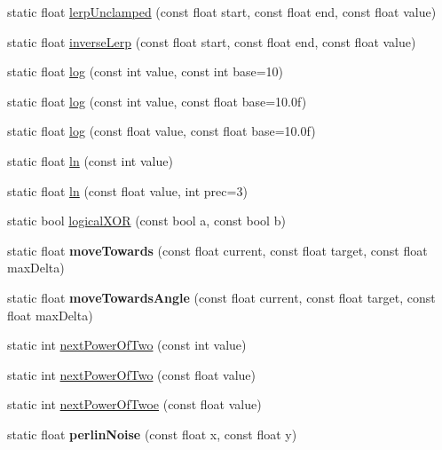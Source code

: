 \begin{DoxyCompactItemize}
\item 
static float \hyperlink{class_matth_a6336a42efd5500e7c470a04eefbcb778}{lerp\+Unclamped} (const float start, const float end, const float value)
\item 
static float \hyperlink{class_matth_a0f4cf803a6e526cd3917810a5f151886}{inverse\+Lerp} (const float start, const float end, const float value)
\item 
static float \hyperlink{class_matth_afba8bc869a1847fa5ea6f2d7ddd66df8}{log} (const int value, const int base=10)
\item 
static float \hyperlink{class_matth_aeee95b77e08d2b8eeb765cba3d3428ef}{log} (const int value, const float base=10.\+0f)
\item 
static float \hyperlink{class_matth_a3b3c174cf818dafa2bb0868c0be2d91a}{log} (const float value, const float base=10.\+0f)
\item 
static float \hyperlink{class_matth_a63ba77faee2dc493e1c23592139426af}{ln} (const int value)
\item 
static float \hyperlink{class_matth_a2e6c35db4051df0578fab51d4ae794b9}{ln} (const float value, int prec=3)
\item 
static bool \hyperlink{class_matth_ac159082536b46168144c41a4d60e2b83}{logical\+X\+O\+R} (const bool a, const bool b)
\item 
\hypertarget{class_matth_a4f366db2949ecfe682dab88bdcf3a824}{}static float {\bfseries move\+Towards} (const float current, const float target, const float max\+Delta)\label{class_matth_a4f366db2949ecfe682dab88bdcf3a824}

\item 
\hypertarget{class_matth_a4e035c33e43aa8bef4c9b548397732e6}{}static float {\bfseries move\+Towards\+Angle} (const float current, const float target, const float max\+Delta)\label{class_matth_a4e035c33e43aa8bef4c9b548397732e6}

\item 
static int \hyperlink{class_matth_a14ad60da4d1beb165d75ee063507d5f5}{next\+Power\+Of\+Two} (const int value)
\item 
static int \hyperlink{class_matth_ab5995f6ad58e9f09fdc30e7978276e68}{next\+Power\+Of\+Two} (const float value)
\item 
static int \hyperlink{class_matth_a930836f29bc1538f8089ccf70a511792}{next\+Power\+Of\+Twoe} (const float value)
\item 
\hypertarget{class_matth_a08350dffcf04a66a87cbf81897f1f148}{}static float {\bfseries perlin\+Noise} (const float x, const float y)\label{class_matth_a08350dffcf04a66a87cbf81897f1f148}


\end{DoxyCompactItemize}
